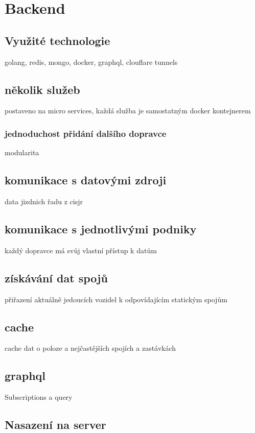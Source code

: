 
\section{Backend}

\subsection{Využité technologie}
golang, redis, mongo, docker, graphql, clouflare tunnels
\subsection{několik služeb}
postaveno na micro services, každá služba je samostatným docker kontejnerem
\subsubsection{jednoduchost přidání dalšího dopravce}
modularita
\subsection {komunikace s datovými zdroji}
data jizdnich řadu z cisjr
\subsection {komunikace s jednotlivými podniky}
každý dopravce má svůj vlastní přístup k datům
\subsection {získávání dat spojů}
přiřazení aktuálně jedoucích vozidel k odpovídajícím statickým spojům
\subsection {cache}
cache dat o poloze a nejčastějších spojích a zastávkách
\subsection {graphql}
Subscriptions a query
\subsection{Nasazení na server}

